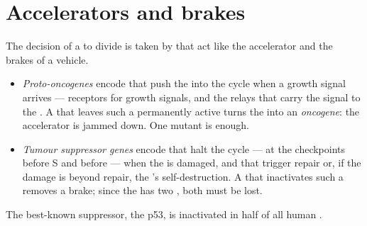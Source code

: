 \section{Accelerators and brakes}

\begin{proposition}\label{prop:g11:cancer:genes}
The decision of a  to divide is taken by  that act like
the accelerator and the brakes of a vehicle.
\begin{itemize}
  \item \emph{Proto-oncogenes} encode 
        that push the  into the cycle when a growth signal
        arrives --- receptors for growth signals, and the relays that
        carry the signal to the . A  that leaves such a
         permanently active turns the  into an
        \emph{oncogene}: the accelerator is jammed down. One mutant
         is enough.
  \item \emph{Tumour suppressor genes}
        encode  that halt the cycle --- at the checkpoints
        before S and before  --- when the  is damaged, and
        that trigger repair or, if the damage is beyond repair, the
        's self-destruction. A  that inactivates such a
         removes a brake; since the  has two , both
        must be lost.
\end{itemize}
The best-known suppressor, the  p53, is inactivated in half of
all human .
\end{proposition}
\admitted

